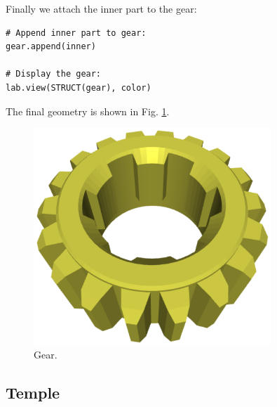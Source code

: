\documentclass{article}
\begin{document}
\noindent
Finally we attach the inner part to the gear:

{\small
\begin{verbatim}
# Append inner part to gear:
gear.append(inner)

# Display the gear:
lab.view(STRUCT(gear), color)
\end{verbatim}
}
\noindent
The final geometry is shown in Fig. \ref{fig:gear-last}.

\begin{figure}[!ht]
\begin{center}
\includegraphics[width=0.8\textwidth]{img/gear-last.png}
\end{center}
\vspace{-2mm}
\caption{Gear.}
\label{fig:gear-last}
\end{figure}
\noindent


\newpage


\subsection{Temple}
\end{document}
